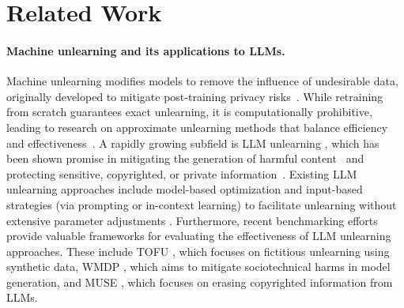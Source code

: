 \section{Related Work}
\label{sec: related_work}
\paragraph{Machine unlearning and its applications to LLMs.}
Machine unlearning modifies models to remove the influence of undesirable data, originally developed to mitigate post-training privacy risks~\citep{cao2015towards,ginart2019making,ullah2021machine,fan2023salun}. While retraining from scratch guarantees exact unlearning, it is computationally prohibitive, leading to research on approximate unlearning methods that balance efficiency and effectiveness~\citep{kurmanji2024towards,fan2024challenging,chen2023boundary,zhang2024unlearncanvas,zhang2024defensive}.
A rapidly growing subfield is LLM unlearning \citep{jang2022knowledge,meng2022locating,yao2024large,eldan2023whos,jia2024soul,zhang2024negative,maini2024tofu,jia2024wagle,liu2024revisiting,fan2024simplicity,thaker2024guardrail}, which has been shown promise in mitigating the generation of harmful content~\citep{yao2024large,li2024wmdp,jia2024soul} and protecting sensitive, copyrighted, or private information~\citep{eldan2023whos,wu2023depn,jang2022knowledge}.
Existing LLM unlearning approaches include model-based optimization    \citep{maini2024tofu, yao2024large, jia2024wagle, fan2024simplicity, zhang2024negative, li2024wmdp, jia2024wagle,wu2023depn,fan2024simplicity} and input-based strategies (via prompting or in-context learning)  to facilitate unlearning without extensive parameter adjustments \citep{liu2024large, thaker2024guardrail, pawelczyk2023context}. Furthermore, recent benchmarking efforts provide valuable frameworks for evaluating the effectiveness of LLM unlearning approaches. These include TOFU \citep{maini2024tofu}, which focuses on fictitious unlearning using synthetic data, WMDP \citep{li2024wmdp}, which aims to mitigate sociotechnical harms in model generation, and MUSE \citep{shi2024muse}, which focuses on erasing copyrighted information from LLMs.

